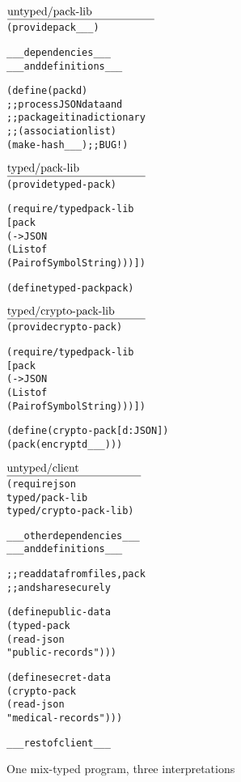 \def\fname#1#2{$\underline{\hbox to #2in{#1}}$\\[-2ex]}

\begin{figure*}[hbt]\footnotesize
  \vspace{-1mm}

\begin{minipage}[t]{2.2in}
\begin{alltt}\fname{untyped/pack-lib}{1.8}
(provide pack _ _ _)

_ _ _  dependencies     _ _ _
_ _ _  and definitions  _ _ _

(define (pack d)
  ;; process JSON data and 
  ;; package it in a dictionary
  ;; (association list)
  (make-hash _ _ _) ;; BUG!)


\end{alltt}
\end{minipage}\begin{minipage}[t]{2.2in}
\begin{alltt}\fname{typed/pack-lib}{1.7}
(provide typed-pack)

(require/typed pack-lib
  [pack 
  (-> JSON 
      (Listof 
       (Pairof Symbol String)))])

(define typed-pack pack) 
\end{alltt}
\smallskip
\begin{alltt}\fname{typed/crypto-pack-lib}{1.7}
(provide crypto-pack) 

(require/typed pack-lib
 [pack 
  (-> JSON 
      (Listof 
       (Pairof Symbol String)))])

(define (crypto-pack [d : JSON])
  (pack (encrypt d _ _ _)))

 \end{alltt}
\end{minipage}\begin{minipage}[t]{2.2in}
\begin{alltt}\fname{untyped/client}{1.65}
(require json 
         typed/pack-lib
           typed/crypto-pack-lib)

_ _ _  other dependencies  _ _ _
_ _ _  and definitions     _ _ _
          
;; read data from files, pack 
;; and share securely 

(define public-data 
  (typed-pack 
   (read-json 
    "public-records")))

(define secret-data 
  (crypto-pack 
   (read-json 
    "medical-records")))
 
 _ _ _ rest of client _ _ _
\end{alltt}\end{minipage}

   \caption{One mix-typed program, three interpretations} \label{fig:example}

  \vspace{-1mm}
\end{figure*}

